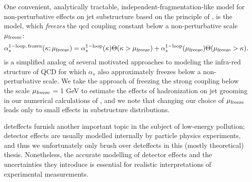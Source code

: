 \begin{subappendices}
One convenient, analytically tractable, independent-fragmentation-like model for non-perturbative effects on jet substructure based on the principle of , is the  model, which \textit{freezes} the \gls{qcd} coupling constant below a non-perturbative scale \(\mu_{\rm freeze}\):
\begin{align}
    \alpha^{\rm 1-loop,\,frozen}_s(\kappa; \mu_{\rm freeze})
    =
    \alpha^{\rm 1-loop}_s(\kappa)
    \Theta(\kappa > \mu_{\rm freeze})
    +
    \alpha^{\rm 1-loop}_s(\mu_{\rm freeze})
    \Theta(\mu_{\rm freeze} > \kappa)
    .
    \label{eq:frozen-coupling}
\end{align}
%
 is a simplified analog of several motivated approaches to modeling the infra-red structure of QCD for which \(\alpha_s\) also approximately freezes below a non-perturbative scale.
%
We take the approach of freezing the strong coupling below the scale \(\mu_{\rm freeze}\) = 1 GeV to estimate the effects of hadronization on jet grooming in our numerical calculations of , and we note that changing our choice of \(\mu_{\rm freeze}\) leads only to small effects in substructure distributions.






\Gls{deteffects} furnish another important topic in the subject of low-energy pollution;
%
detector effects are usually modelled internally by particle physics experiments, and thus we unfortunately only brush over \gls{deteffects} in this (mostly theoretical) thesis.
%
Nonetheless, the accurate modelling of detector effects and the uncertainties they introduce is essential for realistic interpretations of experimental measurements.



\end{subappendices}
